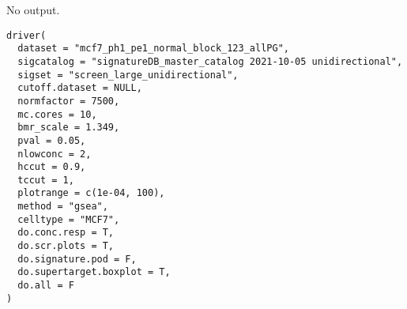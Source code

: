 \documentclass[letterpaper]{book}
\begin{document}
%
\begin{Value}
No output.
\end{Value}
%
\begin{Usage}
\begin{verbatim}
driver(
  dataset = "mcf7_ph1_pe1_normal_block_123_allPG",
  sigcatalog = "signatureDB_master_catalog 2021-10-05 unidirectional",
  sigset = "screen_large_unidirectional",
  cutoff.dataset = NULL,
  normfactor = 7500,
  mc.cores = 10,
  bmr_scale = 1.349,
  pval = 0.05,
  nlowconc = 2,
  hccut = 0.9,
  tccut = 1,
  plotrange = c(1e-04, 100),
  method = "gsea",
  celltype = "MCF7",
  do.conc.resp = T,
  do.scr.plots = T,
  do.signature.pod = F,
  do.supertarget.boxplot = T,
  do.all = F
)
\end{verbatim}
\end{Usage}
%
\end{document}
